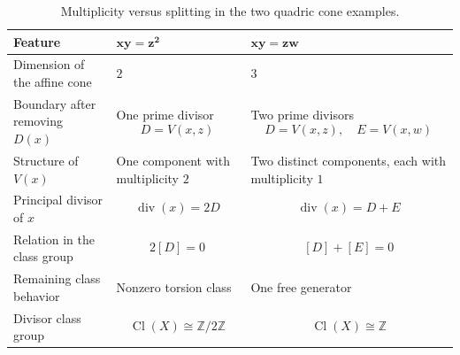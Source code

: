 \documentclass[12pt,a4paper]{article}
\newcommand{\divisor}{\operatorname{div}}
\newcommand{\Z}{\mathbb{Z}}
\newcommand{\Cl}{\operatorname{Cl}}
\theoremstyle{notespace}
\begin{document}
\begin{table}[htbp]
	\centering
	\renewcommand{\arraystretch}{1.4}
	\begin{tabular}{|p{4.6cm}|p{5.0cm}|p{5.0cm}|}
		\hline
		\textbf{Feature}
		&
		\(\boldsymbol{xy=z^2}\)
		&
		\(\boldsymbol{xy=zw}\)
		\\
		\hline
		Dimension of the affine cone
		&
		\(2\)
		&
		\(3\)
		\\
		\hline
		Boundary after removing \(D(x)\)
		&
		One prime divisor
		\[
		D=V(x,z)
		\]
		&
		Two prime divisors
		\[
		D=V(x,z),\quad E=V(x,w)
		\]
		\\
		\hline
		Structure of \(V(x)\)
		&
		One component with multiplicity \(2\)
		&
		Two distinct components, each with multiplicity \(1\)
		\\
		\hline
		Principal divisor of \(x\)
		&
		\[
		\divisor(x)=2D
		\]
		&
		\[
		\divisor(x)=D+E
		\]
		\\
		\hline
		Relation in the class group
		&
		\[
		2[D]=0
		\]
		&
		\[
		[D]+[E]=0
		\]
		\\
		\hline
		Remaining class behavior
		&
		Nonzero torsion class
		&
		One free generator
		\\
		\hline
		Divisor class group
		&
		\[
		\Cl(X)\cong\Z/2\Z
		\]
		&
		\[
		\Cl(X)\cong\Z
		\]
		\\
		\hline
	\end{tabular}
	\caption{Multiplicity versus splitting in the two quadric cone examples.}
\end{table}
\end{document}
